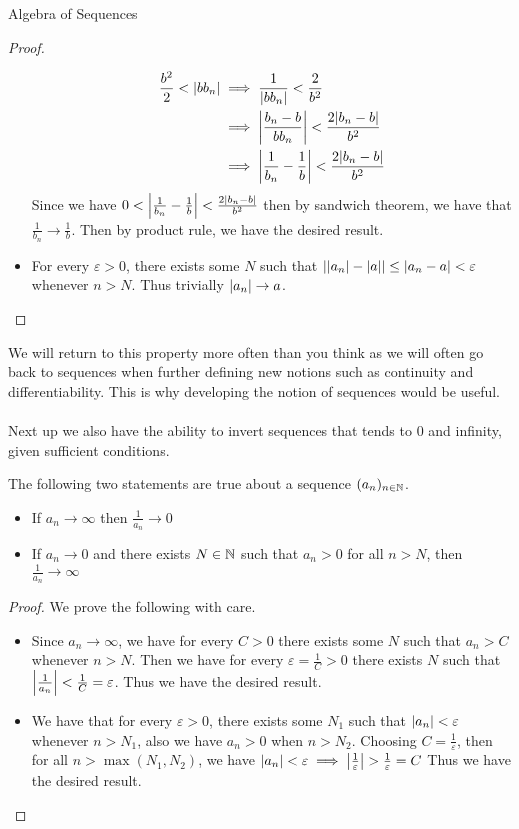 \documentclass[a4paper]{article}
\begin{document}
\begin{prp}{Algebra of Sequences}{}
\begin{proof}
\begin{itemize}
\begin{align*}
\frac{b^2}{2}<\abs{bb_n}&\implies\frac{1}{\abs{bb_n}}<\frac{2}{b^2} \\
&\implies\abs{\frac{b_n-b}{bb_n}}<\frac{2\abs{b_n-b}}{b^2} \\
&\implies\abs{\frac{1}{b_n}-\frac{1}{b}}<\frac{2\abs{b_n-b}}{b^2}
\end{align*}
Since we have $0<\abs{\frac{1}{b_n}-\frac{1}{b}}<\frac{2\abs{b_n-b}}{b^2}$ then by sandwich theorem, we have that $\frac{1}{b_n}\to\frac{1}{b}$. Then by product rule, we have the desired result. 
\item For every $\varepsilon>0$, there exists some $N$ such that $\abs{\abs{a_n}-\abs{a}}\leq\abs{a_n-a}<\varepsilon$ whenever $n>N$. Thus trivially $\abs{a_n}\to a$. 
\end{itemize}
\end{proof}
\end{prp}

We will return to this property more often than you think as we will often go back to sequences when further defining new notions such as continuity and differentiability. This is why developing the notion of sequences would be useful. \\~\\
Next up we also have the ability to invert sequences that tends to $0$ and infinity, given sufficient conditions. 

\begin{prp}{}{} The following two statements are true about a sequence $(a_n)_{n\in\mathbb{N}}$. 
\begin{itemize}
\item If $a_n\to\infty$ then $\frac{1}{a_n}\to 0$
\item If $a_n\to 0$ and there exists $N\in\mathbb{N}$ such that $a_n>0$ for all $n>N$, then $\frac{1}{a_n}\to\infty$
\end{itemize}\tcbline
\begin{proof} We prove the following with care. 
\begin{itemize}
\item Since $a_n\to\infty$, we have for every $C>0$ there exists some $N$ such that $a_n>C$ whenever $n>N$. Then we have for every $\varepsilon=\frac{1}{C}>0$ there exists $N$ such that $\abs{\frac{1}{a_n}}<\frac{1}{C}=\varepsilon$. Thus we have the desired result. 
\item We have that for every $\varepsilon>0$, there exists some $N_1$ such that $\abs{a_n}<\varepsilon$ whenever $n>N_1$, also we have $a_n>0$ when $n>N_2$. Choosing $C=\frac{1}{\varepsilon}$, then for all $n>\max{(N_1,N_2)}$, we have $\abs{a_n}<\varepsilon\implies\abs{\frac{1}{\varepsilon}}>\frac{1}{\varepsilon}=C$ Thus we have the desired result. 
\end{itemize}
\end{proof}
\end{prp}
\end{document}
